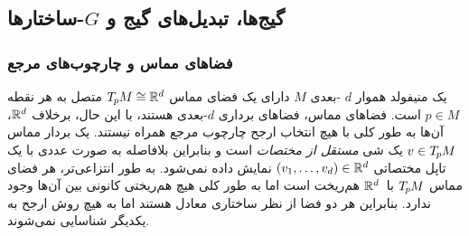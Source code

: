 

\subsection{گیج‌ها، تبدیل‌های گیج و \textit{$G$}-ساختارها}
\label{sec:21_main}


\subsubsection{فضاهای مماس و چارچوب‌های مرجع}
\label{sec:gauges_gauge_trafos}


یک منیفولد هموار $d$ -بعدی $M$ دارای یک فضای مماس $T_{\mkern-1.5mu p}\mkern-.5muM\cong\mathbb{R}^d$ متصل به هر نقطه $p\in M$ است. فضاهای مماس، فضاهای برداری $d$-بعدی هستند، با این حال، برخلاف $\mathbb{R}^d$، آن‌ها به طور کلی با هیچ انتخاب ارجح چارچوب مرجع همراه نیستند. یک بردار مماس $v\in T_{\mkern-1.5mu p}\mkern-.5muM$ یک شی \emph{مستقل از مختصات} است و بنابراین بلافاصله به صورت عددی با یک تاپل مختصاتی $(v_1,\dots,v_d)\in\mathbb{R}^d$ نمایش داده نمی‌شود. به طور انتزاعی‌تر، هر فضای مماس $T_{\mkern-1.5mu p}\mkern-.5muM$ با~$\mathbb{R}^d$ هم‌ریخت است اما به طور کلی هیچ هم‌ریختی کانونی بین آن‌ها وجود ندارد. بنابراین هر دو فضا از نظر ساختاری معادل هستند اما به هیچ روش ارجح به یکدیگر شناسایی نمی‌شوند.


